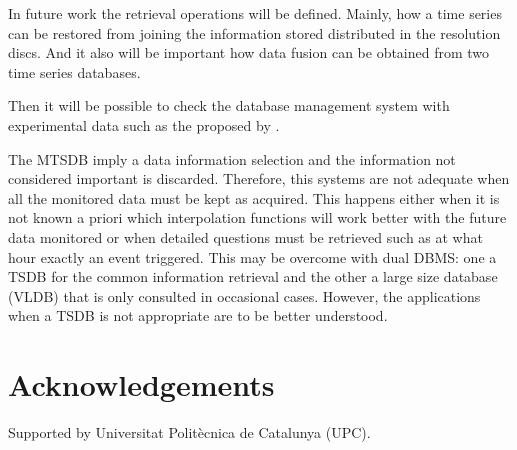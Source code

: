 In future work the retrieval operations will be defined. Mainly, how a
time series can be restored from joining the information stored
distributed in the resolution discs. And it also will be important
how data fusion can be obtained from two time series databases.

Then it will be possible to check the database management system with
experimental data such as the proposed by \cite{keogh02}.

The MTSDB imply a data information selection and the information not considered important is discarded.  Therefore, this systems are not adequate when all the monitored data must be kept as acquired. This happens either when it is not known a priori which interpolation functions will work better with the future data monitored or when detailed questions must be retrieved such as at what hour exactly an event triggered. This may be overcome with dual DBMS: one a TSDB for the common information retrieval and the other a large size database (VLDB) that is only consulted in occasional cases. 
However, the applications when a TSDB is not appropriate are to be better understood. 

          
\section{Acknowledgements}

Supported by Universitat Politècnica de Catalunya (UPC).








